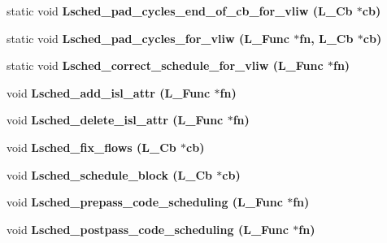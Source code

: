 \begin{CompactItemize}
\item 
static void \bf{Lsched\_\-pad\_\-cycles\_\-end\_\-of\_\-cb\_\-for\_\-vliw} (L\_\-Cb $\ast$cb)
\item 
static void \bf{Lsched\_\-pad\_\-cycles\_\-for\_\-vliw} (L\_\-Func $\ast$fn, L\_\-Cb $\ast$cb)
\item 
static void \bf{Lsched\_\-correct\_\-schedule\_\-for\_\-vliw} (L\_\-Func $\ast$fn)
\item 
void \bf{Lsched\_\-add\_\-isl\_\-attr} (L\_\-Func $\ast$fn)
\item 
void \bf{Lsched\_\-delete\_\-isl\_\-attr} (L\_\-Func $\ast$fn)
\item 
void \bf{Lsched\_\-fix\_\-flows} (L\_\-Cb $\ast$cb)
\item 
void \bf{Lsched\_\-schedule\_\-block} (L\_\-Cb $\ast$cb)
\item 
void \bf{Lsched\_\-prepass\_\-code\_\-scheduling} (L\_\-Func $\ast$fn)
\item 
void \bf{Lsched\_\-postpass\_\-code\_\-scheduling} (L\_\-Func $\ast$fn)
\end{CompactItemize}
